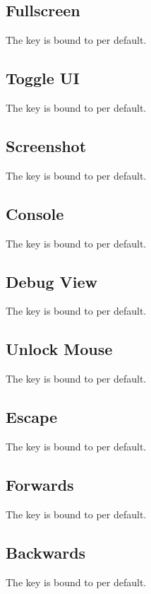 \subsection{Fullscreen}\label{subsec:controls_fullscreen}
The key is bound to
per default.

\subsection{Toggle UI}\label{subsec:controls_toggle ui}
The key is bound to
per default.

\subsection{Screenshot}\label{subsec:controls_screenshot}
The key is bound to
per default.

\subsection{Console}\label{subsec:controls_console}
The key is bound to
per default.

\subsection{Debug View}\label{subsec:controls_debug view}
The key is bound to
per default.

\subsection{Unlock Mouse}\label{subsec:controls_unlock mouse}
The key is bound to
per default.

\subsection{Escape}\label{subsec:controls_escape}
The key is bound to
per default.

\subsection{Forwards}\label{subsec:controls_forwards}
The key is bound to
per default.

\subsection{Backwards}\label{subsec:controls_backwards}
The key is bound to
per default.

